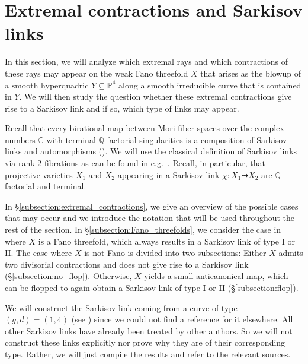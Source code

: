 \documentclass[english,11pt,reqno]{amsart}
\newcommand{\sub}{\subseteq}
\newcommand{\Pfour}{\mathbb{P}^4}
\begin{document}
\section{Extremal contractions and Sarkisov links} \label{section:Sarkisov_links}
%
In this section, we will analyze which extremal rays and which contractions of these rays may appear on the weak Fano threefold $X$ that arises as the blowup of a smooth hyperquadric $Y\sub\Pfour$ along a smooth irreducible curve that is contained in $Y$. We will then study the question whether these extremal contractions give rise to a Sarkisov link and if so, which type of links may appear. \par 
Recall that every birational map between Mori fiber spaces over the complex numbers $\mathbb{C}$ with terminal $\mathbb{Q}$-factorial singularities is a composition of Sarkisov links and automorphisms (\cite[Thm.\ 1.1]{Sarkisov_program_Hacon_McKernan}). We will use the classical definition of Sarkisov links via rank 2 fibrations as can be found in e.g.\ \cite[Def.\ 3.8]{Quotients_of_higher_dim_Cremona_groups-Blanc_Lamy_Zimmermann}. Recall, in particular, that projective varieties $X_1$ and $X_2$ appearing in a Sarkisov link $\chi: X_1 \dashrightarrow X_2$ are $\mathbb{Q}$-factorial and terminal. \par 
In \S \ref{subsection:extremal_contractions}, we give an overview of the possible cases that may occur and we introduce the notation that will be used throughout the rest of the section. In \S\ref{subsection:Fano_threefolds}, we consider the case in where $X$ is a Fano threefold, which always results in a Sarkisov link of type I or II. The case where $X$ is not Fano is divided into two subsections: Either $X$ admits two divisorial contractions and does not give rise to a Sarkisov link (\S\ref{subsection:no_flop}). Otherwise, $X$ yields a small anticanonical map, which can be flopped to again obtain a Sarkisov link of type I or II (\S\ref{subsection:flop}). \par 
We will construct the Sarkisov link coming from a curve of type $(g,d)=(1,4)$ (see ) since we could not find a reference for it elsewhere. All other Sarkisov links have already been treated by other authors. So we will not construct these links explicitly nor prove why they are of their corresponding type. Rather, we will just compile the results and refer to the relevant sources.
%
\end{document}

